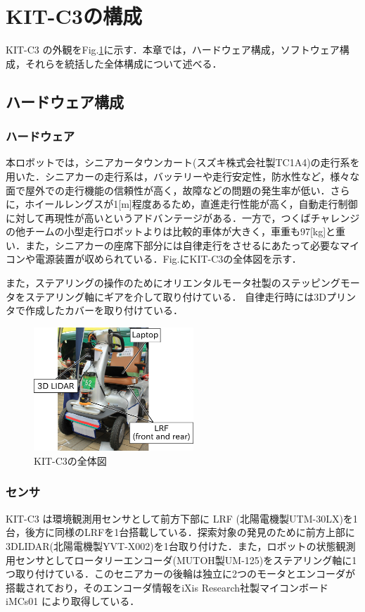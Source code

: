 \documentclass[10pt,a4paper]{jarticle}
\begin{document}
\section{KIT-C3の構成}
KIT-C3 の外観をFig.\ref{kitc3_robot}に示す．本章では，ハードウェア構成，ソフトウェア構成，それらを統括した全体構成について述べる．
\subsection{ハードウェア構成}
\subsubsection{ハードウェア}
本ロボットでは，シニアカータウンカート(スズキ株式会社製TC1A4)の走行系を用いた．シニアカーの走行系は，バッテリーや走行安定性，防水性など，様々な面で屋外での走行機能の信頼性が高く，故障などの問題の発生率が低い．さらに，ホイールレングスが1[m]程度あるため，直進走行性能が高く，自動走行制御に対して再現性が高いというアドバンテージがある．一方で，つくばチャレンジの他チームの小型走行ロボットよりは比較的車体が大きく，車重も97[kg]と重い．また，シニアカーの座席下部分には自律走行をさせるにあたって必要なマイコンや電源装置が収められている．Fig.にKIT-C3の全体図を示す．

また，ステアリングの操作のためにオリエンタルモータ社製のステッピングモータをステアリング軸にギアを介して取り付けている．
自律走行時には3Dプリンタで作成したカバーを取り付けている．

\begin{figure}[bt]
 \centering
 \includegraphics[width=6cm]{./fig/png/thirdrobot_2016ver.png}
 \caption{KIT-C3の全体図}
  \label{kitc3_robot}
\end{figure}


\subsubsection{センサ}
KIT-C3 は環境観測用センサとして前方下部に LRF (北陽電機製UTM-30LX)を1台，後方に同様のLRFを1台搭載している．探索対象の発見のために前方上部に3DLIDAR(北陽電機製YVT-X002)を1台取り付けた．また，ロボットの状態観測用センサとしてロータリーエンコーダ(MUTOH製UM-125)をステアリング軸に1つ取り付けている．このセニアカーの後輪は独立に2つのモータとエンコーダが搭載されており，そのエンコーダ情報をiXis Research社製マイコンボード iMCs01 により取得している．
\end{document}
